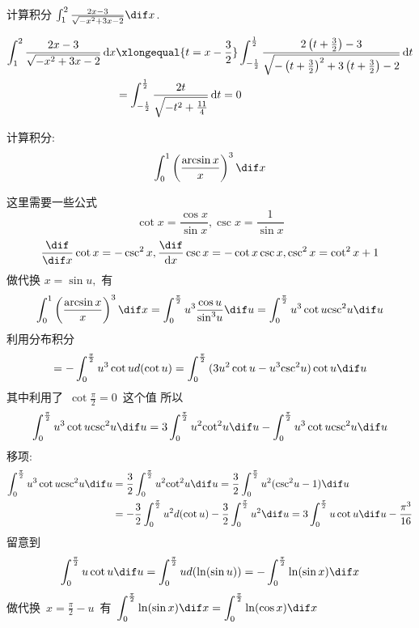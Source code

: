 \documentclass[color=green,titlestyle=hang]{elegantbook}%
\begin{document}
\begin{example}
计算积分 $\int_{1}^{2}\frac{2x-3}{\sqrt{-x^2+3x-2}}\dif x$. 
\end{example}\begin{solution}
\begin{align*}\int_{1}^{2}\frac{2x-3}{\sqrt{-x^2+3x-2}}\,\mathrm{d}x&\xlongequal{t=x-\frac{3}{2}}\int_{-\frac{1}{2}}^{\frac{1}{2}}\frac{2\left(t+\frac{3}{2}\right)-3}{\sqrt{-\left(t+\frac{3}{2}\right)^2+3\left(t+\frac{3}{2}\right)-2}}\,\mathrm{d}t\\
&=\int_{-\frac{1}{2}}^{\frac{1}{2}}\frac{2t}{\sqrt{-t^2+\frac{11}{4}}}\,\mathrm{d}t=0
\end{align*}	
\end{solution}

\begin{exercise}
计算积分:~\[\int_{0}^{1}\left(\frac{\arcsin x}{x}\right)^3\dif x\]
\end{exercise}\begin{solution}
这里需要一些公式
\[\cot x=\frac{\cos x}{\sin x}, \csc x=\frac{1}{\sin x}\]
\[
\frac{\dif }{\dif x} \cot x=-\csc ^{2} x, \frac{\dif }{\mathrm{d} x} \csc x=-\cot x \csc x, \csc ^{2} x=\cot ^{2} x+1
\]
做代换 $x=\sin u,$ 有 
\[\int_{0}^{1}\left(\frac{\arcsin x}{x}\right)^3\dif x= \int_0^{\frac{\pi }{2}} {{u^3}\frac{{\cos u}}{{{{\sin }^3}u}}\dif u}  = \int_0^{\frac{\pi }{2}} {{u^3}\cot u{{\csc }^2}u\dif u}\]
利用分布积分\[ =  - \int_0^{\frac{\pi }{2}} {{u^3}\cot ud(\cot u)}  = \int_0^{\frac{\pi }{2}} {(3{u^2}\cot u - {u^3}{{\csc }^2}u)\cot u\dif u} \]
其中利用了~$\displaystyle\cot \frac{\pi }{2} = 0$~这个值
所以\[\int_0^{\frac{\pi }{2}} {{u^3}\cot u{{\csc }^2}u\dif u}  = 3\int_0^{\frac{\pi }{2}} {{u^2}{{\cot }^2}u\dif u}  - \int_0^{\frac{\pi }{2}} {{u^3}\cot u{{\csc }^2}u\dif u} \]
移项:	
\begin{align*}
\int_0^{\frac{\pi }{2}} {{u^3}\cot u{{\csc }^2}u\dif u}  &= \frac{3}{2}\int_0^{\frac{\pi }{2}} {{u^2}{{\cot }^2}u\dif u}  = \frac{3}{2}\int_0^{\frac{\pi }{2}} {{u^2}({{\csc }^2}u - 1)\dif u} \\
&=  - \frac{3}{2}\int_0^{\frac{\pi }{2}} {{u^2}d(\cot u)}  - \frac{3}{2}\int_0^{\frac{\pi }{2}} {{u^2}\dif u}  = 3\int_0^{\frac{\pi }{2}} {u\cot u\dif u}  - \frac{{{\pi ^3}}}{{16}}
\end{align*}
留意到\[\int_0^{\frac{\pi }{2}} {u\cot u\dif u}  = \int_0^{\frac{\pi }{2}} {ud(\ln (\sin u))}  =  - \int_0^{\frac{\pi }{2}} {\ln (\sin x)\dif x} \]
做代换~$\displaystyle x = \frac{\pi }{2} - u$~有~$\displaystyle\int_0^{\frac{\pi }{2}} {\ln (\sin x)\dif x}  = \int_0^{\frac{\pi }{2}} {\ln (\cos x)\dif x} $

\end{solution}
\end{document}
